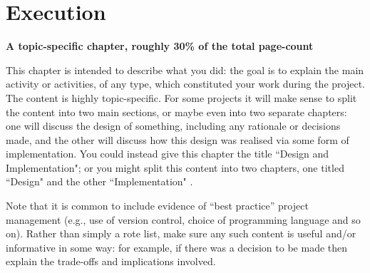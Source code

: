 \documentclass[ %
                    author={Carlos Duran Calle},
                supervisor={Dr. Felipe Campelo},
                    degree={MSc},
                     title={Comparative Machine Learning Analysis for Student Dropout Prediction in a Virtual Learning Environment},
                  subtitle={Incorporating Student Engagement and Socio-Economic Features},
                      type={},
                      year={2025}]{dissertation}
\begin{document}


\chapter{Execution}
\label{chap:execution}

{\bf A topic-specific chapter, roughly 30\% of the total page-count}
\vspace{1cm} 

\noindent
This chapter is intended to describe what you did: the goal is to explain
the main activity or activities, of any type, which constituted your work 
during the project.  The content is highly topic-specific. For some 
projects it will make sense to split the content into two main sections, or maybe even into two separate chapters: one 
will discuss the design of something, including any rationale or decisions made, 
and the other will discuss how this design was realised via some form of 
implementation.  You could instead give this chapter the title ``Design and Implementation"; or you might split this content into two chapters, one titled ``Design" and the other ``Implementation" .

Note that it is common to include evidence of ``best practice'' project 
management (e.g., use of version control, choice of programming language 
and so on).  Rather than simply a rote list, make sure any such content 
is useful and/or informative in some way: for example, if there was a 
decision to be made then explain the trade-offs and implications 
involved.
\end{document}
